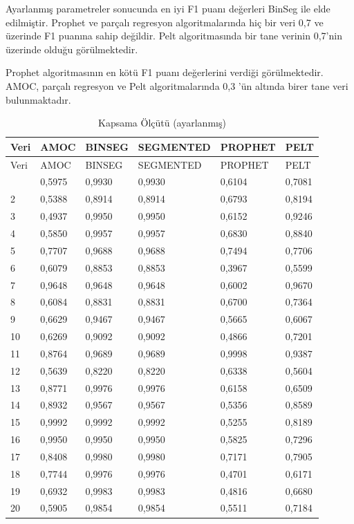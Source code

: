 \documentclass[12pt,twoside]{deuthesis}
\begin{document}
Ayarlanmış parametreler sonucunda en iyi F1 puanı değerleri BinSeg ile elde edilmiştir. Prophet ve parçalı regresyon algoritmalarında hiç bir veri 0,7 ve üzerinde F1 puanına sahip değildir. Pelt algoritmasında bir tane verinin 0,7'nin üzerinde olduğu görülmektedir.

Prophet algoritmasının en kötü F1 puanı değerlerini verdiği görülmektedir. AMOC, parçalı regresyon ve Pelt algoritmalarında 0,3 'ün altında birer tane veri bulunmaktadır.

\begin{longtable}[]{@{}llllll@{}}
\caption{\label{tab:nvar11} Kapsama Ölçütü (ayarlanmış)}\tabularnewline
\toprule\noalign{}
Veri & AMOC & BINSEG & SEGMENTED & PROPHET & PELT \\
\midrule\noalign{}
\endfirsthead
\toprule\noalign{}
Veri & AMOC & BINSEG & SEGMENTED & PROPHET & PELT \\
\midrule\noalign{}
\endhead
\bottomrule\noalign{}
\endlastfoot
1 & 0,5975 & 0,9930 & 0,9930 & 0,6104 & 0,7081 \\
2 & 0,5388 & 0,8914 & 0,8914 & 0,6793 & 0,8194 \\
3 & 0,4937 & 0,9950 & 0,9950 & 0,6152 & 0,9246 \\
4 & 0,5850 & 0,9957 & 0,9957 & 0,6830 & 0,8840 \\
5 & 0,7707 & 0,9688 & 0,9688 & 0,7494 & 0,7706 \\
6 & 0,6079 & 0,8853 & 0,8853 & 0,3967 & 0,5599 \\
7 & 0,9648 & 0,9648 & 0,9648 & 0,6002 & 0,9670 \\
8 & 0,6084 & 0,8831 & 0,8831 & 0,6700 & 0,7364 \\
9 & 0,6629 & 0,9467 & 0,9467 & 0,5665 & 0,6067 \\
10 & 0,6269 & 0,9092 & 0,9092 & 0,4866 & 0,7201 \\
11 & 0,8764 & 0,9689 & 0,9689 & 0,9998 & 0,9387 \\
12 & 0,5639 & 0,8220 & 0,8220 & 0,6338 & 0,5604 \\
13 & 0,8771 & 0,9976 & 0,9976 & 0,6158 & 0,6509 \\
14 & 0,8932 & 0,9567 & 0,9567 & 0,5356 & 0,8589 \\
15 & 0,9992 & 0,9992 & 0,9992 & 0,5255 & 0,8189 \\
16 & 0,9950 & 0,9950 & 0,9950 & 0,5825 & 0,7296 \\
17 & 0,8408 & 0,9980 & 0,9980 & 0,7171 & 0,7905 \\
18 & 0,7744 & 0,9976 & 0,9976 & 0,4701 & 0,6171 \\
19 & 0,6932 & 0,9983 & 0,9983 & 0,4816 & 0,6680 \\
20 & 0,5905 & 0,9854 & 0,9854 & 0,5511 & 0,7184 \\
\end{longtable}
\end{document}

